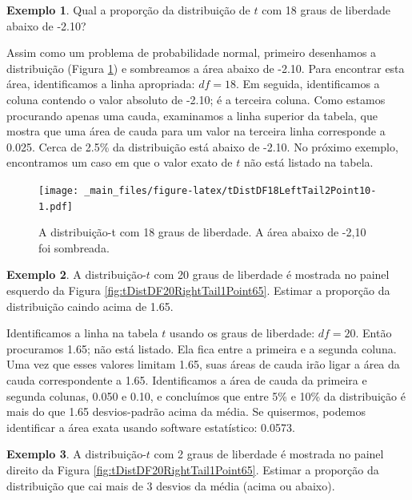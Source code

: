 \documentclass[
]{book}
\theoremstyle{definition}
\theoremstyle{definition}
\newtheorem{example}{Exemplo}[chapter]
\theoremstyle{definition}
\theoremstyle{definition}
\theoremstyle{remark}
\begin{document}
\begin{example}
\protect\hypertarget{exm:unnamed-chunk-186}{}{\label{exm:unnamed-chunk-186} }Qual a proporção da distribuição de \(t\) com 18 graus de liberdade abaixo de -2.10?
\end{example}

Assim como um problema de probabilidade normal, primeiro desenhamos a distribuição (Figura \ref{fig:tDistDF18LeftTail2Point10}) e sombreamos a área abaixo de -2.10. Para encontrar esta área, identificamos a linha apropriada: \(df=18\). Em seguida, identificamos a coluna contendo o valor absoluto de -2.10; é a terceira coluna. Como estamos procurando apenas uma cauda, examinamos a linha superior da tabela, que mostra que uma área de cauda para um valor na terceira linha corresponde a 0.025. Cerca de 2.5\% da distribuição está abaixo de -2.10. No próximo exemplo, encontramos um caso em que o valor exato de \(t\) não está listado na tabela.

\begin{figure}
\centering
\texttt{[image: \_main\_files/figure-latex/tDistDF18LeftTail2Point10-1.pdf]}
\caption{\label{fig:tDistDF18LeftTail2Point10}A distribuição-t com 18 graus de liberdade. A área abaixo de -2,10 foi sombreada.}
\end{figure}

\begin{example}
\protect\hypertarget{exm:unnamed-chunk-187}{}{\label{exm:unnamed-chunk-187} }A distribuição-\(t\) com 20 graus de liberdade é mostrada no painel esquerdo da Figura \ref{fig:tDistDF20RightTail1Point65}. Estimar a proporção da distribuição caindo acima de 1.65.
\end{example}

Identificamos a linha na tabela \(t\) usando os graus de liberdade: \(df = 20\). Então procuramos 1.65; não está listado. Ela fica entre a primeira e a segunda coluna. Uma vez que esses valores limitam 1.65, suas áreas de cauda irão ligar a área da cauda correspondente a 1.65. Identificamos a área de cauda da primeira e segunda colunas, 0.050 e 0.10, e concluímos que entre 5\% e 10\% da distribuição é mais do que 1.65 desvios-padrão acima da média. Se quisermos, podemos identificar a área exata usando software estatístico: 0.0573.

\begin{example}
\protect\hypertarget{exm:unnamed-chunk-189}{}{\label{exm:unnamed-chunk-189} }A distribuição-\(t\) com 2 graus de liberdade é mostrada no painel direito da Figura \ref{fig:tDistDF20RightTail1Point65}. Estimar a proporção da distribuição que cai mais de 3 desvios da média (acima ou abaixo).
\end{example}
\end{document}
